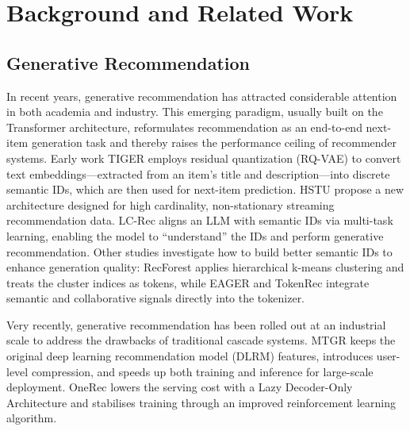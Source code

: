 \section{Background and Related Work}
\label{bg}
\subsection{Generative Recommendation}

In recent years, generative recommendation has attracted considerable attention in both academia and industry. This emerging paradigm, usually built on the Transformer architecture, reformulates recommendation as an end-to-end next-item generation task and thereby raises the performance ceiling of recommender systems.
Early work TIGER \citep{TIGER} employs residual quantization (RQ-VAE) \citep{rqvae} to convert text embeddings—extracted from an item’s title and description—into discrete semantic IDs, which are then used for next-item prediction. HSTU \citep{HSTU} propose a new architecture designed for high cardinality, non-stationary streaming recommendation data.
LC-Rec \citep{LCRec} aligns an LLM with semantic IDs via multi-task learning, enabling the model to “understand” the IDs and perform generative recommendation. Other studies investigate how to build better semantic IDs to enhance generation quality: RecForest \citep{recforest} applies hierarchical k-means clustering and treats the cluster indices as tokens, while EAGER \citep{eagar} and TokenRec \citep{TOKENRec} integrate semantic and collaborative signals directly into the tokenizer.

Very recently, generative recommendation has been rolled out at an industrial scale to address the drawbacks of traditional cascade systems. MTGR \citep{mtgr} keeps the original deep learning recommendation model (DLRM) features, introduces user-level compression, and speeds up both training and inference for large-scale deployment. OneRec \citep{OneRec} lowers the serving cost with a Lazy Decoder-Only Architecture and stabilises training through an improved reinforcement learning algorithm.

